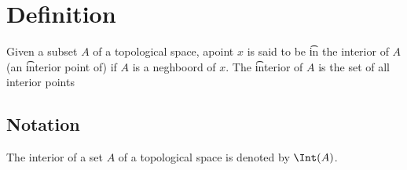 
\section*{Definition}

Given a subset $A$ of a topological space, apoint $x$ is said to be \t{in the interior of} $A$ (an \t{interior point of}) if $A$ is a neghboord of $x$.
The \t{interior} of $A$ is the set of all interior points

\subsection*{Notation}

The interior of a set $A$ of a topological space is denoted by $\Int(A)$.

\blankpage